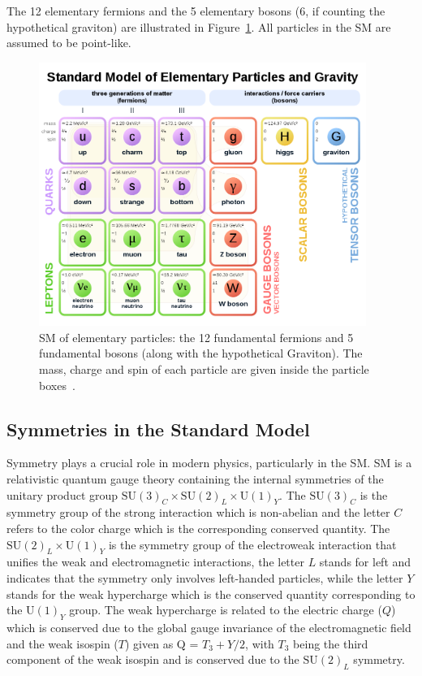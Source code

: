 The 12 elementary fermions and the 5 elementary bosons (6, if counting the hypothetical graviton) 
are illustrated in Figure~\ref{fig:SM:particles}. All particles in the SM are assumed to be point-like. 
\begin{figure}[htbp]
\centering
\includegraphics[width=0.95\textwidth]{Theory/plots/SM.png}
\caption{ 
SM of elementary particles: the 12 fundamental fermions and 5 fundamental bosons 
(along with the hypothetical Graviton). 
The mass, charge and spin of each particle are given inside the particle boxes~\cite{PDG}. 
}
\label{fig:SM:particles}
\end{figure}
      


\subsection{Symmetries in the Standard Model}
Symmetry plays a crucial role in modern physics, particularly in
the SM. 
SM is a relativistic quantum gauge theory 
containing the internal symmetries of the unitary product group 
$\text{SU}(3)_C \times \text{SU}(2)_L\times \text{U}(1)_Y$.
The $\text{SU}(3)_C$ is the symmetry group of the strong interaction which is non-abelian 
and the letter $C$ refers to the color charge which is the corresponding conserved quantity.
The $\text{SU}(2)_L\times \text{U}(1)_Y$ is the symmetry group of the electroweak interaction
that unifies the weak and electromagnetic interactions, the letter $L$ stands for 
left and indicates that the symmetry only involves left-handed particles,
while the letter $Y$ stands for the weak hypercharge which is the conserved quantity corresponding to
the $\text{U}(1)_Y$ group.
The weak hypercharge is related to the electric charge ($Q$) which is conserved due to
the global gauge invariance of the electromagnetic field
and the weak isospin ($T$) 
given as Q = $T_3 + Y/2$, with $T_3$ being the third component of the weak isospin and 
is conserved due to the $\text{SU}(2)_L$ symmetry.

